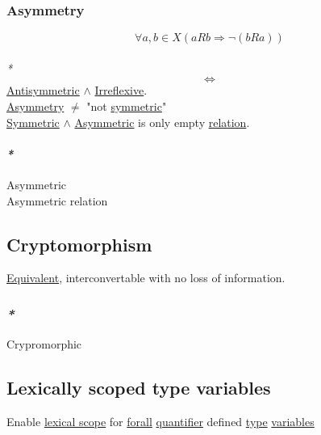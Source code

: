 \documentclass[11pt]{article}
\begin{document}
\subsubsection{\label{org7f1379b}Asymmetry}
\label{sec:orge0d7cd9}

$$ \forall a,b \in X (aRb \Rightarrow \neg (bRa)) $$\\
\emph{*} $$ \iff $$ \hyperref[org11a1c21]{Antisymmetric} \(\land\) \hyperref[orgfc0fc35]{Irreflexive}.\\
\hyperref[org7f1379b]{Asymmetry} \(\ne\) "not \hyperref[org8248303]{symmetric}"\\
\hyperref[org8248303]{Symmetric} \(\land\) \hyperref[org8d7c284]{Asymmetric} is only empty \hyperref[org6e8ae46]{relation}.\\

\paragraph{\emph{*}}
\label{sec:orgadef20b}

\label{org8d7c284}Asymmetric\\
\label{orgd1ca94f}Asymmetric relation\\

\subsection{\label{orgcabd961}Cryptomorphism}
\label{sec:orgc281d7e}

\hyperref[org6802c96]{Equivalent}, interconvertable with no loss of information.\\

\subsubsection{\emph{*}}
\label{sec:org3113fa6}

\label{org1d59f2f}Crypromorphic\\

\subsection{\label{orgfa2ba3c}Lexically scoped type variables}
\label{sec:orga2b21b1}

Enable \hyperref[org8fb06f5]{lexical scope} for \hyperref[org746fdae]{forall} \hyperref[org7158dde]{quantifier} defined \hyperref[org4fbaeb8]{type} \hyperref[orgd3f3ade]{variables}\\
\end{document}
